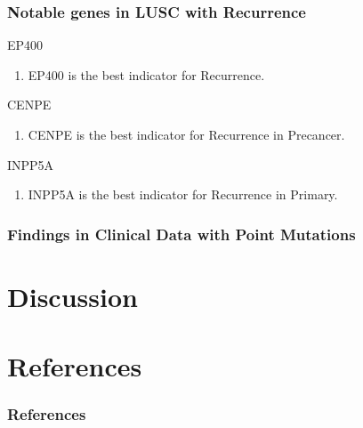 \documentclass{beamer}
\begin{document}
    \begin{frame}[allowframebreaks]
        \frametitle{Notable genes in LUSC with Recurrence}

        \begin{block}{EP400}
            \begin{enumerate}
                \item EP400 is the best indicator for Recurrence.
            \end{enumerate}
        \end{block}

        \begin{block}{CENPE}
            \begin{enumerate}
                \item CENPE is the best indicator for Recurrence in Precancer.
            \end{enumerate}
        \end{block}

        \begin{block}{INPP5A}
            \begin{enumerate}
                \item INPP5A is the best indicator for Recurrence in Primary.
            \end{enumerate}
        \end{block}
    \end{frame}

    \begin{frame}
        \frametitle{Findings in Clinical Data with Point Mutations}
    \end{frame}

    \section{Discussion}

    \section{References}
    \begin{frame}[allowframebreaks]
        \frametitle{References}
        
        
    \end{frame}
\end{document}
